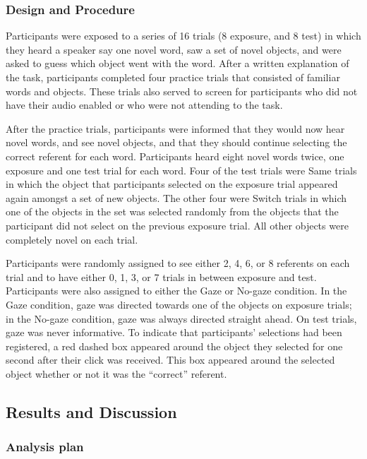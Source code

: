\documentclass[a4paper,man,natbib]{apa6}
\begin{document}
\subsubsection{Design and Procedure}\label{design-and-procedure}

Participants were exposed to a series of 16 trials (8 exposure, and 8
test) in which they heard a speaker say one novel word, saw a set of
novel objects, and were asked to guess which object went with the word.
After a written explanation of the task, participants completed four
practice trials that consisted of familiar words and objects. These
trials also served to screen for participants who did not have their
audio enabled or who were not attending to the task.

After the practice trials, participants were informed that they would
now hear novel words, and see novel objects, and that they should
continue selecting the correct referent for each word. Participants
heard eight novel words twice, one exposure and one test trial for each
word. Four of the test trials were Same trials in which the object that
participants selected on the exposure trial appeared again amongst a set
of new objects. The other four were Switch trials in which one of the
objects in the set was selected randomly from the objects that the
participant did not select on the previous exposure trial. All other
objects were completely novel on each trial.

Participants were randomly assigned to see either 2, 4, 6, or 8
referents on each trial and to have either 0, 1, 3, or 7 trials in
between exposure and test. Participants were also assigned to either the
Gaze or No-gaze condition. In the Gaze condition, gaze was directed
towards one of the objects on exposure trials; in the No-gaze condition,
gaze was always directed straight ahead. On test trials, gaze was never
informative. To indicate that participants' selections had been
registered, a red dashed box appeared around the object they selected
for one second after their click was received. This box appeared around
the selected object whether or not it was the ``correct'' referent.

\subsection{Results and Discussion}\label{results-and-discussion}

\subsubsection{Analysis plan}\label{analysis-plan}
\end{document}
